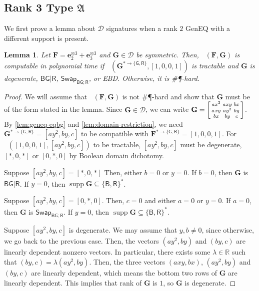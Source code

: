 \documentclass[11pt]{article}
\newtheorem{lemma}[theorem]{Lemma}
\DeclareMathOperator{\holbs}{Holant^*_2}
\DeclareMathOperator{\holts}{Holant^*_3}
\DeclareMathOperator{\supp}{supp}
\newcommand{\db}{\mathsf{B}}
\newcommand{\dg}{\mathsf{G}}
\newcommand{\dr}{\mathsf{R}}
\newcommand{\geneq}{\textsf{GenEQ}\xspace}
\newcommand{\swhelper}[1]{$\mathsf{Swap}_{#1}$\xspace}
\newcommand{\swbg}{\swhelper{\db \dg; \dr}}
\newcommand{\sph}{\#\P-hard\xspace}
\newcommand{\teh}{^{\otimes 3}}
\newcommand{\domres}[1]{
  ^{*\to\{#1\}}
}
\newcommand{\strspt}{\textsf{EBD}\xspace}
\newcommand{\ternarytractgeneq}{$\mathfrak{A}$\xspace}
\begin{document}
\subsection{Rank 3 Type \texorpdfstring{\ternarytractgeneq}{A}}
We first prove a lemma about $\mathcal{D}$ signatures when a rank $2$ \geneq with a different support is present.
\begin{lemma}\label{lem:gr-equality-D-dichotomy}
  Let $\mathbf{F} = \mathbf{e}_2 \teh + \mathbf{e}_3 \teh$ and $\mathbf{G} \in \mathcal{D}$ be symmetric.
  Then, $\holts(\mathbf{F}, \mathbf{G})$ is computable in polynomial time if $\holbs(\mathbf{G}\domres{\dg, \dr}, [1, 0, 0, 1])$ is tractable and $\mathbf{G}$ is degenerate, $\db \dg | \dr$, \swbg, or \strspt.
  Otherwise, it is \sph.
\end{lemma}
\begin{proof}
  We will assume that $\holts(\mathbf{F}, \mathbf{G})$ is not \sph and show that $\mathbf{G}$ must be of the form stated in the lemma.
  Since $\mathbf{G} \in \mathcal{D}$, we can write $\mathbf{G} = \begin{bsmallmatrix}
    a x^2 & a xy & bx \\
    axy & ay^2 & by \\
    bx & by & c
  \end{bsmallmatrix}$.
  By \cref{lem:geneq-eqbg} and \cref{lem:domain-restriction}, we need $\mathbf{G}\domres{\dg, \dr} = [ay^2, by, c]$ to be compatible with $\mathbf{F}\domres{\dg, \dr} = [1, 0, 0, 1]$.
  For $\holbs([1, 0, 0, 1], [ay^2, by, c])$ to be tractable, $[ay^2, by, c]$ must be degenerate, $[*, 0, *]$ or $[0, *, 0]$ by Boolean domain dichotomy.

  Suppose $[ay^2, by, c] = [*, 0, *]$
  Then, either $b = 0$ or $y = 0$.
  If $b = 0$, then $\mathbf{G}$ is $\db \dg | \dr$.
  If $y = 0$, then $\supp \mathbf{G} \subseteq \{\db, \dr\}^*$.

  Suppose $[ay^2, by, c] = [0, *, 0]$.
  Then, $c = 0$ and either $a = 0$ or $y = 0$.
  If $a = 0$, then $\mathbf{G}$ is \swbg.
  If $y = 0$, then $\supp \mathbf{G} \subseteq \{\db, \dr\}^*$.

  Suppose $[ay^2, by, c]$ is degenerate. 
  We may assume that $y, b \ne 0$, since otherwise, we go back to the previous case.
  Then, the vectors $(ay^2, by)$ and $(by, c)$ are linearly dependent nonzero vectors.
  In particular, there exists some $\lambda \in \mathbb{R}$ such that $(by, c) = \lambda (ay^2, by)$.
  Then, the three vectors $(axy, bx)$, $(ay^2, by)$ and $(by, c)$ are linearly dependent, which means the bottom two rows of $\mathbf{G}$ are linearly dependent.
  This implies that rank of $\mathbf{G}$ is $1$, so $\mathbf{G}$ is degenerate.
\end{proof}
\end{document}
